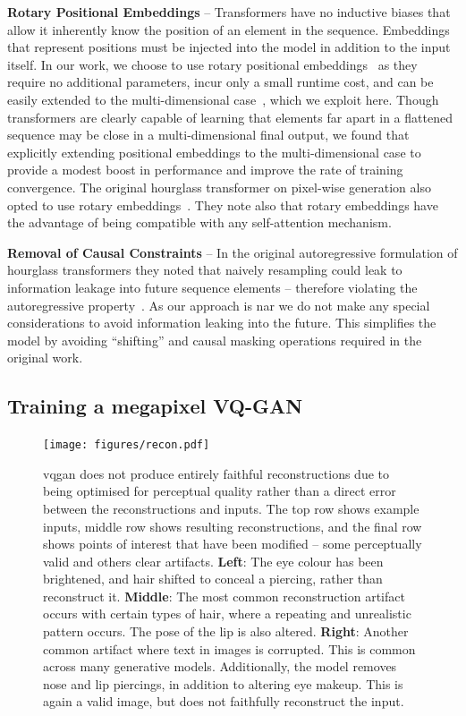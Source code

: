 \textbf{Rotary Positional Embeddings} -- Transformers have no inductive biases
that allow it inherently know the position of an element in the sequence.
Embeddings that represent positions must be injected into the model in addition
to the input itself. In our work, we choose to use rotary positional
embeddings~\cite{su2021roformer} as they require no additional parameters, incur
only a small runtime cost, and can be easily extended to the multi-dimensional
case~\cite{rope-eleutherai}, which we exploit here. Though transformers are
clearly capable of learning that elements far apart in a flattened sequence may
be close in a multi-dimensional final output, we found that explicitly extending
positional embeddings to the multi-dimensional case to provide a modest boost in
performance and improve the rate of training convergence. The original hourglass
transformer on pixel-wise generation also opted to use rotary
embeddings~\cite{nawrot2021hierarchical}. They note also that rotary embeddings
have the advantage of being compatible with any self-attention mechanism.

\textbf{Removal of Causal Constraints} -- In the original autoregressive
formulation of hourglass transformers they noted that naively resampling could
leak to information leakage into future sequence elements -- therefore violating
the autoregressive property~\cite{nawrot2021hierarchical}. As our approach is
\gls{nar} we do not make any special considerations to avoid information leaking
into the future. This simplifies the model by avoiding ``shifting'' and causal
masking operations required in the original work.

\subsection{Training a megapixel VQ-GAN}
\label{subsec:megagan}

\begin{figure}[ht]
    \centering
    \texttt{[image: figures/recon.pdf]}
    \caption{
        \gls{vqgan} does not produce entirely faithful reconstructions due to
        being optimised for perceptual quality rather than a direct error between
        the reconstructions and inputs. The top row shows example inputs, middle row
        shows resulting reconstructions, and the final row shows points of interest that
        have been modified -- some perceptually valid and others clear
        artifacts. 
        \textbf{Left}: The eye colour has been brightened, and hair
        shifted to conceal a piercing, rather than reconstruct it.
        \textbf{Middle}: The most common reconstruction artifact occurs with
        certain types of hair, where a repeating and unrealistic pattern occurs. The
        pose of the lip is also altered. 
        \textbf{Right}: Another common artifact where text in images is
        corrupted. This is common across many generative models. Additionally,
        the model removes nose and lip piercings, in addition to altering eye
        makeup. This is again a valid image, but does not faithfully reconstruct
        the input.}
    \label{fig:recon}
\end{figure}

